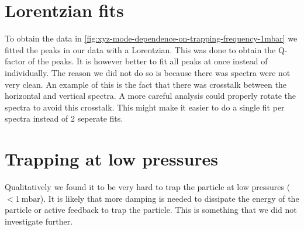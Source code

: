 \section*{Lorentzian fits}
To obtain the data in \autoref{fig:xyz-mode-dependence-on-trapping-frequency-1mbar} we fitted the peaks in our data with a Lorentzian. This was done to obtain the Q-factor of the peaks. It is however better to fit all peaks at once instead of individually. The reason we did not do so is because there was spectra were not very clean. An example of this is the fact that there was crosstalk between the horizontal and vertical spectra. A more careful analysis could properly rotate the spectra to avoid this crosstalk. This might make it easier to do a single fit per spectra instead of 2 seperate fits.

\section*{Trapping at low pressures}
Qualitatively we found it to be very hard to trap the particle at low pressures ($<\qty{1}{\milli\bar}$). It is likely that more damping is needed to dissipate the energy of the particle or active feedback to trap the particle. This is something that we did not investigate further.
